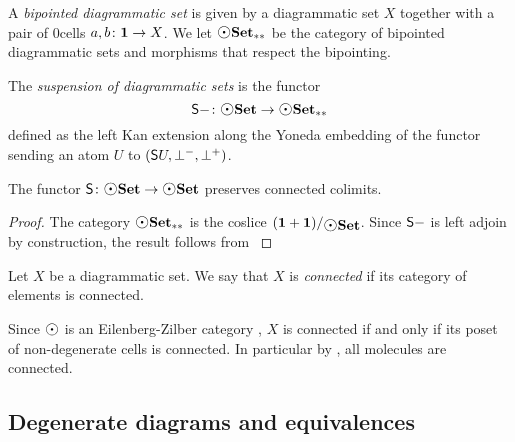 \begin{dfn} 
    A \emph{bipointed diagrammatic set} is given by a diagrammatic set \( X \) together with a pair of \( 0 \)\nbd cells \( a, b \colon \mathbf{1} \to X \).
    We let \( \bpt\dgmSet \) be the category of bipointed diagrammatic sets and morphisms that respect the bipointing.
\end{dfn}

\begin{dfn} [Suspension]
    The \emph{suspension of diagrammatic sets} is the functor
    \begin{equation*}
        \sus{-} \colon \dgmSet \to \bpt{\dgmSet}
    \end{equation*} 
    defined as the left Kan extension along the Yoneda embedding of the functor sending an atom \( U \) to \( (\mathsf{S}{U}, \bot^-, \bot^+) \).
\end{dfn}

\begin{prop} \label{prop:suspension_of_dgmSet}
    The functor \( \sus{} \colon \dgmSet \to \dgmSet \) preserves connected colimits.    
\end{prop}
\begin{proof}
    The category \( \bpt{\dgmSet} \) is the coslice \( \slice{(\pt + \pt)}{\dgmSet} \).
    Since \( \mathsf{S}{-} \) is left adjoin by construction, the result follows from \cite[Proposition 3.3.8]{riehl2019context}
\end{proof}

\begin{dfn} 
    Let \( X \) be a diagrammatic set. 
    We say that \( X \) is \emph{connected} if its category of elements is connected.
\end{dfn}

\begin{rmk} \label{rmk:ez_connected}
    Since \( \atom \) is an Eilenberg-Zilber category \cite[Proposition 1.17]{chanavat2024htpy}, \( X \) is connected if and only if its poset of non-degenerate cells is connected.
    In particular by \cite[Lemma 3.3.13]{hadzihasanovic2024combinatorics}, all molecules are connected.
\end{rmk}

\subsection{Degenerate diagrams and equivalences}

